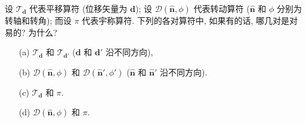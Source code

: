 \documentclass{assignment}
\begin{document}
\begin{prob}[课本习题 4.2]
    设 $\mathscr{T}_{\bm{d}}$ 代表平移算符 (位移矢量为 $\bm{d}$); 设 $\mathscr{D}(\hat{\bm{n}},\phi)$ 代表转动算符 ($\hat{\bm{n}}$ 和 $\phi$ 分别为转轴和转角); 而设 $\pi$ 代表宇称算符. 下列的各对算符中, 如果有的话, 哪几对是对易的? 为什么?
    \begin{itemize}
        \item[(a)] $\mathscr{T}_{\bm{d}}$ 和 $\mathscr{T}_{\bm{d}'}$ ($\bm{d}$ 和 $\bm{d}'$ 沿不同方向),
        \item[(b)] $\mathscr{D}(\hat{\bm{n}},\phi)$ 和 $\mathscr{D}(\hat{\bm{n}}',\phi')$ ($\hat{\bm{n}}$ 和 $\hat{\bm{n}}'$ 沿不同方向).
        \item[(c)] $\mathscr{T}_{\bm{d}}$ 和 $\pi$.
        \item[(d)] $\mathscr{D}(\hat{\bm{n}},\phi)$ 和 $\pi$.
    \end{itemize}
\end{prob}
\end{document}
